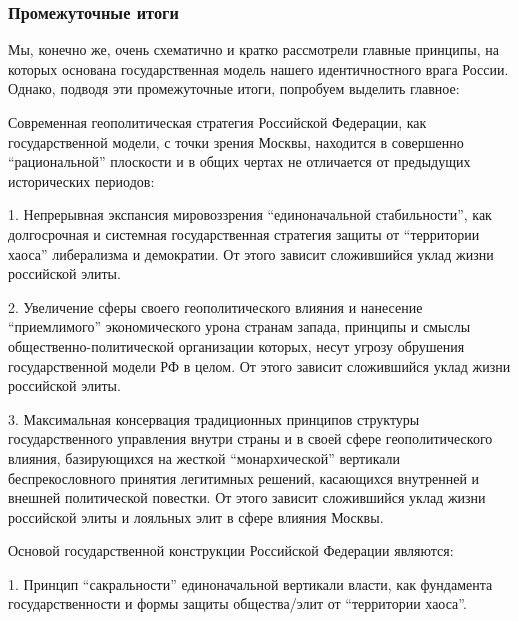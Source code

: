  
 
 
 
 

\subsubsection{Промежуточные итоги}

Мы, конечно же, очень схематично и кратко рассмотрели главные принципы, на
которых основана государственная модель нашего идентичностного врага России.
Однако, подводя эти промежуточные итоги, попробуем выделить главное:

Современная геополитическая стратегия Российской Федерации, как государственной
модели, с точки зрения Москвы, находится в совершенно \enquote{рациональной} плоскости
и в общих чертах не отличается от предыдущих исторических периодов:

1. Непрерывная экспансия мировоззрения \enquote{единоначальной стабильности}, как
долгосрочная и системная государственная стратегия защиты от \enquote{территории хаоса}
либерализма и демократии. От этого зависит сложившийся уклад жизни российской
элиты.

2. Увеличение сферы своего геополитического влияния и нанесение \enquote{приемлимого}
экономического урона странам запада, принципы и смыслы общественно-политической
организации которых, несут угрозу обрушения государственной модели РФ в целом.
От этого зависит сложившийся уклад жизни российской элиты.

3. Максимальная консервация традиционных принципов структуры государственного
управления внутри страны и в своей сфере геополитического влияния, базирующихся
на жесткой \enquote{монархической} вертикали беспрекословного принятия легитимных
решений, касающихся внутренней и внешней политической повестки. От этого
зависит сложившийся уклад жизни российской элиты и лояльных элит в сфере
влияния Москвы.

Основой государственной конструкции Российской Федерации являются:

1. Принцип \enquote{сакральности} единоначальной вертикали власти, как фундамента
государственности и формы защиты общества/элит от \enquote{территории хаоса}.

